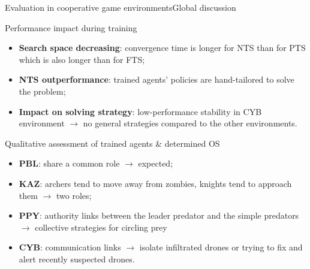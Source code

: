 \begin{frame}{Evaluation in cooperative game environments}{Global discussion}

    \begin{block}{Performance impact during training}
        \begin{itemize}
            \item \textbf{Search space decreasing}: convergence time is longer for NTS than for PTS which is also longer than for FTS;
            \item \textbf{NTS outperformance}: trained agents' policies are hand-tailored to solve the problem;
            \item \textbf{Impact on solving strategy}: low-performance stability in CYB environment $\rightarrow$ no general strategies compared to the other environments.
        \end{itemize}
    \end{block}

    \begin{block}{Qualitative assessment of trained agents \& determined OS}
        \begin{itemize}
            \item \textbf{PBL}: share a common role $\rightarrow$ expected;
            \item \textbf{KAZ}: archers tend to move away from zombies, knights tend to approach them $\rightarrow$ two roles;
            \item \textbf{PPY}: authority links between the leader predator and the simple predators $\rightarrow$ collective strategies for circling prey
            \item \textbf{CYB}: communication links $\rightarrow$ isolate infiltrated drones or trying to fix and alert recently suspected drones.
        \end{itemize}
    \end{block}

\end{frame}
